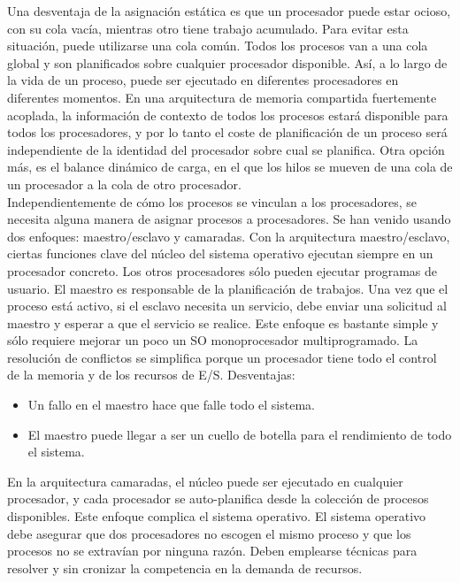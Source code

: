 \documentclass{article}
\begin{document}
					Una desventaja de la asignación estática es que un procesador puede estar ocioso, con su cola vacía, mientras otro tiene trabajo acumulado. Para evitar esta situación, puede utilizarse una cola común. Todos los procesos van a una cola global y son planificados sobre cualquier procesador disponible. Así, a lo largo de la vida de un proceso, puede ser ejecutado en diferentes procesadores en diferentes momentos. En una arquitectura de memoria compartida fuertemente acoplada, la información de contexto de todos los procesos estará disponible para todos los procesadores, y por lo tanto el coste de planificación de un proceso será independiente de la identidad del procesador sobre cual se planifica. Otra opción más, es el balance dinámico de carga, en el que los hilos se mueven de una cola de un procesador a la cola de otro procesador. \\
					
					Independientemente de cómo los procesos se vinculan a los procesadores, se necesita alguna manera de asignar procesos a procesadores. Se han venido usando dos enfoques: maestro/esclavo y camaradas. Con la arquitectura maestro/esclavo, ciertas funciones clave del núcleo del sistema operativo ejecutan siempre en un procesador concreto. Los otros procesadores sólo pueden ejecutar programas de usuario. El maestro es responsable de la planificación de trabajos. Una vez que el proceso está activo, si el esclavo necesita un servicio, debe enviar una solicitud al maestro y esperar a que el servicio se realice. Este enfoque es bastante simple y sólo requiere mejorar un poco un SO monoprocesador multiprogramado. La resolución de conflictos se simplifica porque un procesador tiene todo el control de la memoria y de los recursos de E/S. Desventajas:
					
					\begin{itemize}
					\item Un fallo  en el maestro hace que falle todo el sistema.
					\item El maestro puede llegar a ser un cuello de botella para el rendimiento de todo el sistema.
					\end{itemize}
					
					En la arquitectura camaradas, el núcleo puede ser ejecutado en cualquier procesador, y cada procesador se auto-planifica desde la colección de procesos disponibles. Este enfoque complica el sistema operativo. El sistema operativo debe asegurar que dos procesadores no escogen el mismo proceso y que los procesos no se extravían por ninguna razón. Deben emplearse técnicas para resolver y sin cronizar la competencia en la demanda de recursos. \\
					
\end{document}
